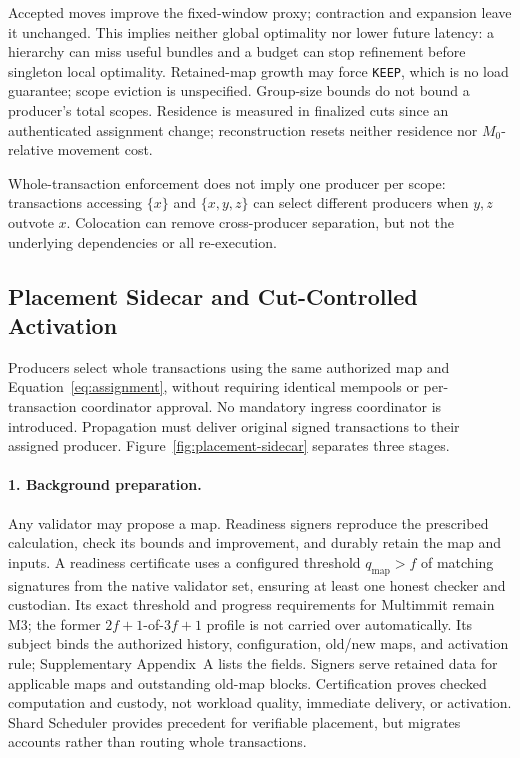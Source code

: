Accepted moves improve the fixed-window proxy; contraction and expansion leave it unchanged. This implies neither global optimality nor lower future latency: a hierarchy can miss useful bundles and a budget can stop refinement before singleton local optimality. Retained-map growth may force \texttt{KEEP}, which is no load guarantee; scope eviction is unspecified. Group-size bounds do not bound a producer's total scopes. Residence is measured in finalized cuts since an authenticated assignment change; reconstruction resets neither residence nor \(M_0\)-relative movement cost.

Whole-transaction enforcement does not imply one producer per scope: transactions accessing \(\{x\}\) and \(\{x,y,z\}\) can select different producers when \(y,z\) outvote \(x\). Colocation can remove cross-producer separation, but not the underlying dependencies or all re-execution.

\subsection{Placement Sidecar and Cut-Controlled Activation}
\label{sec:placement-sidecar}

Producers select whole transactions using the same authorized map and Equation~\ref{eq:assignment}, without requiring identical mempools or per-transaction coordinator approval. No mandatory ingress coordinator is introduced. Propagation must deliver original signed transactions to their assigned producer. Figure~\ref{fig:placement-sidecar} separates three stages.

\paragraph{1. Background preparation.}
Any validator may propose a map. Readiness signers reproduce the prescribed calculation, check its bounds and improvement, and durably retain the map and inputs. A readiness certificate uses a configured threshold \(q_{\mathrm{map}}>f\) of matching signatures from the native validator set, ensuring at least one honest checker and custodian. Its exact threshold and progress requirements for Multimmit remain M3; the former \(2f+1\)-of-\(3f+1\) profile is not carried over automatically. Its subject binds the authorized history, configuration, old/new maps, and activation rule; Supplementary Appendix~A lists the fields. Signers serve retained data for applicable maps and outstanding old-map blocks. Certification proves checked computation and custody, not workload quality, immediate delivery, or activation. Shard Scheduler provides precedent for verifiable placement, but migrates accounts rather than routing whole transactions. \citep{shardscheduler}

